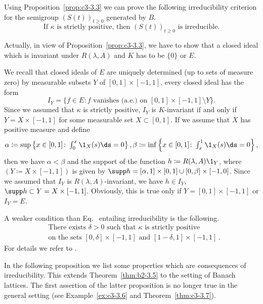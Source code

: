 \begin{examples}
\begin{enumerate}[\upshape (i), wide, labelindent=.25em]
	Using Proposition~\ref{prop:c3-3.3} we can prove the following irreducibility criterion for the semigroup $(S(t))_{t\geq 0}$ generated by $B$.
	\begin{equation}\label{eq:c3-3.7}
		\text{If } \kappa \text{ is strictly positive, then } (S(t))_{t\geq 0} \text{ is irreducible.}
	\end{equation}
	
	Actually, in view of Proposition~\ref{prop:c3-3.3}, we have to show that a closed ideal which is invariant under $R(\lambda,A)$ and $K$ has to be $\{0\}$ or $E$.
	
	We recall that closed ideals of\/ $E$ are uniquely determined (up to sets of measure zero) by measurable subsets $Y$ of\/ $[0,1]\times[-1,1]$, \ie  every closed ideal has the form
	\[
		I_{Y} = \{f \in E \colon f \text{ vanishes (a.e.) on } [0,1]\times[-1,1] \setminus Y\}.
	\]
	Since we assumed that $\kappa$ is strictly positive, $I_{Y}$ is $K$-invariant if and only if\/ $Y = X\times[-1,1]$ for some measurable set $X \subset [0,1]$.
	If we assume that $X$ has positive measure and define
    \[\textstyle
	\alpha \coloneqq \sup\left\{x \in [0,1] \colon \int_{0}^{x} \1_{X}(s)\ds  = 0\right\}, \beta \coloneqq \inf\left\{x \in [0,1] \colon \int_{x}^{1} \1_{X}(s)\ds  = 0 \right\},
	\] 
	then we have $\alpha < \beta$ and the support of the function $h \coloneqq R(\lambda,A)\1_{Y}$, where 
	$(Y \coloneqq X\times[-1,1])$ is given by $\supp h = [\alpha,1]\times[0,1] \cup [0,\beta]\times[-1,0]$.
	Since we assumed that $I_{Y}$ is $R(\lambda,A)$-invariant, we have $h \in I_{Y}$, \ie  $\supp h \subset Y = X\times[-1,1]$.
	Obviously, this is true only if\/ $Y = [0,1]\times[-1,1]$ or $I_{Y} = E$.
	
	A weaker condition than Eq.~ entailing irreducibility is the following.
	\begin{equation}\label{eq:c3-3.8}
		\begin{split}
		&\text{There exists } \delta > 0 \text{ such that } \kappa \text{ is strictly positive}\\
		&\text{on the sets } [0,\delta]\times[-1,1] \text{ and } [1-\delta,1]\times[-1,1]\,.
		\end{split}
	\end{equation}
	For details we refer to \textcite{greiner:1984d}.
	\end{enumerate}	
\end{examples}
	
In the following proposition we list some properties which are consequences of irreducibility. 
This extends Theorem~\ref{thm:b2-3.5} to the setting of Banach lattices. 
The first assertion of the latter proposition is no longer true in the general setting (see Example~\ref{ex:c3-3.6} and Theorem~\ref{thm:c3-3.7}). 

